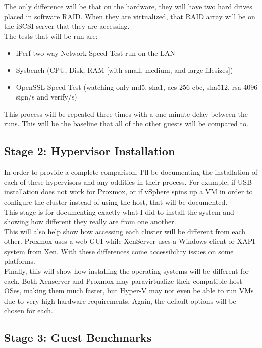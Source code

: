 \documentclass[12pt]{spieman}  %
\begin{document}
The only difference will be that on the hardware, they will have two hard drives placed in software RAID. When they are virtualized, that RAID array will be on the iSCSI server that they are accessing.\\

The tests that will be run are:

\begin{itemize}
\item iPerf two-way Network Speed Test run on the LAN
\item Sysbench (CPU, Disk, RAM [with small, medium, and large filesizes])
\item OpenSSL Speed Test (watching only md5, sha1, aes-256 cbc, sha512, rsa 4096 sign/s and verify/s)
\end{itemize}

This process will be repeated three times with a one minute delay between the runs. This will be the baseline that all of the other guests will be compared to.

\subsection{Stage 2: Hypervisor Installation}
\label{subsec:stage-2}
In order to provide a complete comparison, I'll be documenting the installation of each of these hypervisors and any oddities in their process. For example, if USB installation does not work for Proxmox, or if vSphere spins up a VM in order to configure the cluster instead of using the host, that will be documented.\\

This stage is for documenting exactly what I did to install the system and showing how different they really are from one another.\\

This will also help show how accessing each cluster will be different from each other. Proxmox uses a web GUI while XenServer uses a Windows client or XAPI system from Xen. With these differences come accessibility issues on some platforms.\\

Finally, this will show how installing the operating systems will be different for each. Both Xenserver and Proxmox may paravirtualize their compatible host OSes, making them much faster, but Hyper-V may not even be able to run VMs due to very high hardware requirements. Again, the default options will be chosen for each.

\subsection{Stage 3: Guest Benchmarks}
\label{subsec:stage-3}
\end{document}
